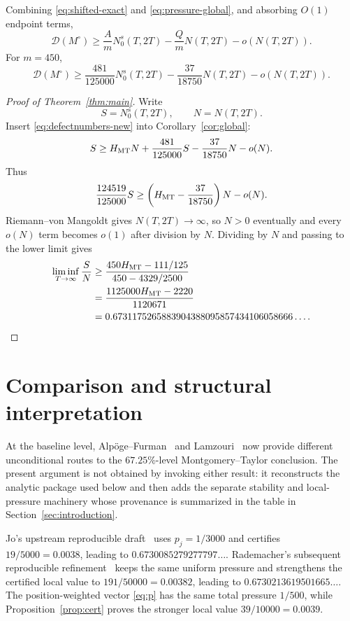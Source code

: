 \documentclass[11pt]{article}
\begin{document}
Combining \eqref{eq:shifted-exact} and \eqref{eq:pressure-global},
and absorbing \(O(1)\) endpoint terms,
\begin{equation}\label{eq:defectglobal-new}
 \mathcal D(M^\circ)
 \ge
 \frac{A}{m}N_0^s(T,2T)
 -\frac{Q}{m}N(T,2T)
 -o(N(T,2T)).
\end{equation}
For \(m=450\),
\begin{equation}\label{eq:defectnumbers-new}
 \mathcal D(M^\circ)
 \ge
 \frac{481}{125000}N_0^s(T,2T)
 -\frac{37}{18750}N(T,2T)
 -o(N(T,2T)).
\end{equation}


\begin{proof}[Proof of Theorem~\ref{thm:main}]
Write
\[
 S=N_0^s(T,2T),
 \qquad
 N=N(T,2T).
\]
Insert \eqref{eq:defectnumbers-new} into
Corollary~\ref{cor:global}:
\[
 S
 \ge
 H_{\rm MT}N
 +\frac{481}{125000}S
 -\frac{37}{18750}N
 -o(N).
\]
Thus
\[
 \frac{124519}{125000}S
 \ge
 \left(H_{\rm MT}-\frac{37}{18750}\right)N-o(N).
\]
Riemann--von Mangoldt gives \(N(T,2T)\to\infty\), so \(N>0\)
eventually and every \(o(N)\) term becomes \(o(1)\) after division by
\(N\).  Dividing by \(N\) and passing to the lower limit gives
\begin{align*}
 \liminf_{T\to\infty}\frac{S}{N}
 &\ge
 \frac{450H_{\rm MT}-111/125}
      {450-4329/2500}\\
 &=
 \frac{1125000H_{\rm MT}-2220}{1120671}\\
 &=
 0.6731175265883904388095857434106058666\ldots .
\end{align*}
\end{proof}

\section{Comparison and structural interpretation}

At the baseline level, Alpöge--Furman~\cite{AlpogeFurman26} and
Lamzouri~\cite{Lamzouri26} now provide different unconditional routes to the
\(67.25\%\)-level Montgomery--Taylor conclusion.  The present argument is not
obtained by invoking either result: it reconstructs the analytic package used
below and then adds the separate stability and local-pressure machinery whose
provenance is summarized in the table in Section~\ref{sec:introduction}.

Jo's upstream reproducible draft~\cite{Jo26} uses
\(p_j=1/3000\) and certifies \(19/5000=0.0038\), leading to
\(0.6730085279277797\ldots\).  Rademacher's subsequent reproducible
refinement~\cite{Rademacher26} keeps the same uniform pressure and strengthens
the certified local value to \(191/50000=0.00382\), leading to
\(0.6730213619501665\ldots\).  The position-weighted vector \eqref{eq:p}
has the same total pressure \(1/500\), while
Proposition~\ref{prop:cert} proves the stronger local value
\(39/10000=0.0039\).
\end{document}
